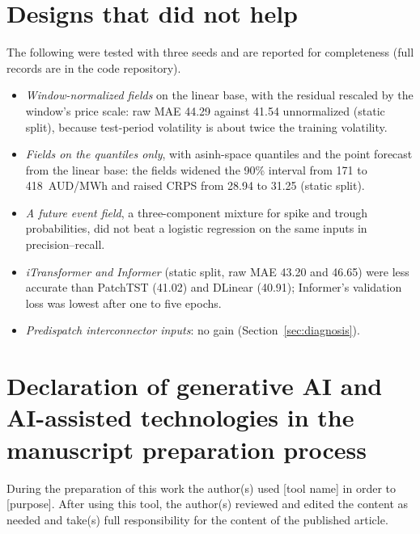 \documentclass[preprint,12pt]{elsarticle}
\begin{document}
\begin{table}[t]
\centering
\caption{Structural and detector ablations of the detected-event DGF on the static split, raw prices, three-region means over three seeds (MAE $\pm$ seed standard deviation). The last column gives the paired MAE difference to the detected-event DGF per seed; positive means the variant is worse.}
\label{tab:ablations-static}
\resizebox{\textwidth}{!}{}
\end{table}

\section{Designs that did not help}
\label{app:negative}

The following were tested with three seeds and are reported for completeness (full records are in the code repository).
\begin{itemize}
\item \emph{Window-normalized fields} on the linear base, with the residual rescaled by the window's price scale: raw MAE 44.29 against 41.54 unnormalized (static split), because test-period volatility is about twice the training volatility.
\item \emph{Fields on the quantiles only}, with asinh-space quantiles and the point forecast from the linear base: the fields widened the 90\% interval from 171 to 418~AUD/MWh and raised CRPS from 28.94 to 31.25 (static split).
\item \emph{A future event field}, a three-component mixture for spike and trough probabilities, did not beat a logistic regression on the same inputs in precision--recall.
\item \emph{iTransformer and Informer} (static split, raw MAE 43.20 and 46.65) were less accurate than PatchTST (41.02) and DLinear (40.91); Informer's validation loss was lowest after one to five epochs.
\item \emph{Predispatch interconnector inputs}: no gain (Section~\ref{sec:diagnosis}).
\end{itemize}

\clearpage
\section*{Declaration of generative AI and AI-assisted technologies in the manuscript preparation process}
During the preparation of this work the author(s) used [tool name] in order to [purpose]. After using this tool, the author(s) reviewed and edited the content as needed and take(s) full responsibility for the content of the published article.



\end{document}
